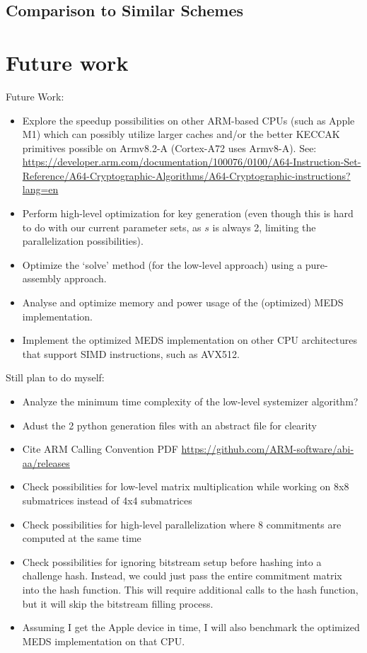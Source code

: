 \documentclass[11pt,a4paper]{report}
\theoremstyle{definition}
\begin{document}
\section{Comparison to Similar Schemes}

\chapter{Future work}
\label{ch:futurework}
Future Work:
\begin{itemize}
  \item Explore the speedup possibilities on other ARM-based CPUs (such as Apple M1) which can possibly utilize larger caches and/or the better KECCAK primitives possible on Armv8.2-A (Cortex-A72 uses Armv8-A). See: \url{https://developer.arm.com/documentation/100076/0100/A64-Instruction-Set-Reference/A64-Cryptographic-Algorithms/A64-Cryptographic-instructions?lang=en}
  \item Perform high-level optimization for key generation (even though this is hard to do with our current parameter sets, as $s$ is always 2, limiting the parallelization possibilities).
  \item Optimize the `solve' method (for the low-level approach) using a pure-assembly approach.
  \item Analyse and optimize memory and power usage of the (optimized) MEDS implementation.
  \item Implement the optimized MEDS implementation on other CPU architectures that support SIMD instructions, such as AVX512.
\end{itemize}

Still plan to do myself:
\begin{itemize}
  \item Analyze the minimum time complexity of the low-level systemizer algorithm?
  \item Adust the 2 python generation files with an abstract file for clearity
  \item Cite ARM Calling Convention PDF \url{https://github.com/ARM-software/abi-aa/releases}
  \item Check possibilities for low-level matrix multiplication while working on 8x8 submatrices instead of 4x4 submatrices
  \item Check possibilities for high-level parallelization where 8 commitments are computed at the same time
  \item Check possibilities for ignoring bitstream setup before hashing into a challenge hash. Instead, we could just pass the entire commitment matrix into the hash function. This will require additional calls to the hash function, but it will skip the bitstream filling process.
  \item Assuming I get the Apple device in time, I will also benchmark the optimized MEDS implementation on that CPU.
\end{itemize}
\end{document}
